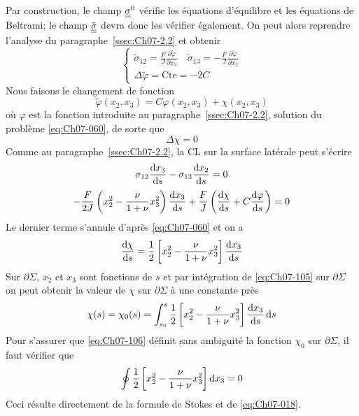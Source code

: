 Par construction, le champ $\underline{\underline{\sigma}}^0$ vérifie les équations d'équilibre 
et les équations de Beltrami; le champ $\tilde{\underline{\underline{\sigma}}}$  devra donc les vérifier également.
On peut alors reprendre l'analyse du paragraphe~\ref{ssec:Ch07-2.2} et obtenir 
\begin{equation}
    \left\{
    \begin{aligned}
        \tilde{\sigma}_{12} = \frac{F}{J} \frac{\partial \tilde{\varphi}}{\partial x_3} \quad \tilde{\sigma}_{13} = - \frac{F}{J} \frac{\partial \tilde{\varphi}}{\partial x_2} \\
        \Delta \tilde{\varphi} = \text{Cte} = -2C
    \end{aligned}
    \right.
    \label{eq:Ch07-102}
\end{equation}
Nous faisons le changement de fonction 
\begin{equation}
    \tilde{\varphi} (x_2,x_3) = C\varphi(x_2,x_3) + \chi (x_2,x_3)
    \label{eq:Ch07-103}
\end{equation}
où $\varphi$ est la fonction introduite au paragraphe~\ref{ssec:Ch07-2.2}, solution du problème \eqref{eq:Ch07-060}, de sorte que
\begin{equation}
    \Delta\chi = 0
    \label{eq:Ch07-104}
\end{equation}
Comme au paragraphe~\ref{ssec:Ch07-2.2}, la CL sur la surface latérale peut s'écrire 
\begin{displaymath}
    \sigma_{12} \frac{\mathop{\mathrm{{}d}}\mathopen{} x_3}{\mathop{\mathrm{{}d}}\mathopen{} s} - \sigma_{13} \frac{\mathop{\mathrm{{}d}}\mathopen{} x_2}{\mathop{\mathrm{{}d}}\mathopen{} s} = 0
\end{displaymath}
\begin{displaymath}
    -\frac{F}{2J} \left( x_2^2 - \frac{\nu}{1+\nu} x_3^2 \right) \frac{\mathop{\mathrm{{}d}}\mathopen{} x_3}{\mathop{\mathrm{{}d}}\mathopen{} s} + \frac{F}{J} \left( \frac{\mathop{\mathrm{{}d}}\mathopen{} \chi}{\mathop{\mathrm{{}d}}\mathopen{} s} + C \frac{\mathop{\mathrm{{}d}}\mathopen{} \varphi}{\mathop{\mathrm{{}d}}\mathopen{} s} \right) = 0
\end{displaymath}
Le dernier terme s'annule d'après \eqref{eq:Ch07-060} et on a 
\begin{equation}
    \frac{\mathop{\mathrm{{}d}}\mathopen{} \chi}{\mathop{\mathrm{{}d}}\mathopen{} s} = \frac{1}{2} \left[ x_2^2 - \frac{\nu}{1+\nu} x_3^2 \right] \frac{\mathop{\mathrm{{}d}}\mathopen{} x_3}{\mathop{\mathrm{{}d}}\mathopen{} s}
    \label{eq:Ch07-105}
\end{equation}
Sur $\partial \Sigma$, $x_2$ et $x_3$ sont fonctions de $s$ et par intégration de \eqref{eq:Ch07-105} sur $\partial \Sigma$ on peut obtenir la valeur de $\chi$ sur $\partial \Sigma$ à une constante près
\begin{equation}
    \chi(s) = \chi_0 (s) = \int_{s_0}^s \frac{1}{2} \left[ x_2^2 - \frac{\nu}{1+\nu} x_3^2 \right] \frac{\mathop{\mathrm{{}d}}\mathopen{} x_3}{\mathop{\mathrm{{}d}}\mathopen{} s} \mathop{\mathrm{{}d}}\mathopen{} s
    \label{eq:Ch07-106}
\end{equation}
Pour s'assurer que \eqref{eq:Ch07-106} définit sans ambiguité la fonction $\chi_0$ sur $\partial \Sigma$, il faut vérifier que 
\begin{equation}
    \oint \frac{1}{2} \left[ x_2^2 - \frac{\nu}{1+\nu} x_3^2 \right]\mathop{\mathrm{{}d}}\mathopen{} x_3 = 0
    \label{eq:Ch07-107}
\end{equation}
Ceci résulte directement de la formule de Stokes et de \eqref{eq:Ch07-018}. 

